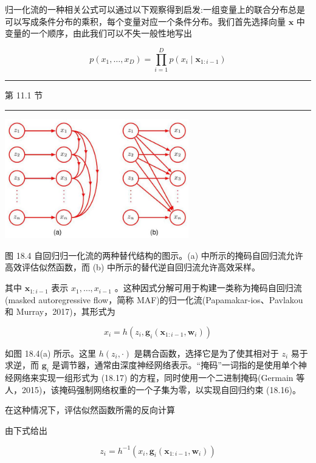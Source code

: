 \documentclass[10pt]{report}
\newcommand{\HRule}{\begin{center}\rule{0.9\linewidth}{0.2mm}\end{center}}
\begin{document}
归一化流的一种相关公式可以通过以下观察得到启发:一组变量上的联合分布总是可以写成条件分布的乘积，每个变量对应一个条件分布。我们首先选择向量 \(\mathbf{x}\) 中变量的一个顺序，由此我们可以不失一般性地写出

\[
p\left( {{x}_{1},\ldots ,{x}_{D}}\right)  = \mathop{\prod }\limits_{{i = 1}}^{D}p\left( {{x}_{i} \mid  {\mathbf{x}}_{1 : i - 1}}\right)  \tag{18.16}
\]

\HRule

第 11.1 节

\HRule

\begin{center}
\includegraphics[max width=0.6\textwidth]{images/0194e279-9b28-703a-88f4-c3ac21e2010d_572_692_342_756_492_0.jpg}
\end{center}
\hspace*{3em} 

图 18.4 自回归归一化流的两种替代结构的图示。(a) 中所示的掩码自回归流允许高效评估似然函数，而 (b) 中所示的替代逆自回归流允许高效采样。

其中 \({\mathbf{x}}_{1 : i - 1}\) 表示 \({x}_{1},\ldots ,{x}_{i - 1}\) 。这种因式分解可用于构建一类称为掩码自回归流(masked autoregressive flow，简称 MAF)的归一化流(Papamakar-ios、Pavlakou 和 Murray，2017)，其形式为

\[
{x}_{i} = h\left( {{z}_{i},{\mathbf{g}}_{i}\left( {{\mathbf{x}}_{1 : i - 1},{\mathbf{w}}_{i}}\right) }\right)  \tag{18.17}
\]

如图 18.4(a) 所示。这里 \(h\left( {{z}_{i}, \cdot  }\right)\) 是耦合函数，选择它是为了使其相对于 \({z}_{i}\) 易于求逆，而 \({\mathbf{g}}_{i}\) 是调节器，通常由深度神经网络表示。“掩码”一词指的是使用单个神经网络来实现一组形式为 (18.17) 的方程，同时使用一个二进制掩码(Germain 等人，2015)，该掩码强制网络权重的一个子集为零，以实现自回归约束 (18.16)。

在这种情况下，评估似然函数所需的反向计算

由下式给出

\[
{z}_{i} = {h}^{-1}\left( {{x}_{i},{\mathbf{g}}_{i}\left( {{\mathbf{x}}_{1 : i - 1},{\mathbf{w}}_{i}}\right) }\right)  \tag{18.18}
\]
\end{document}
